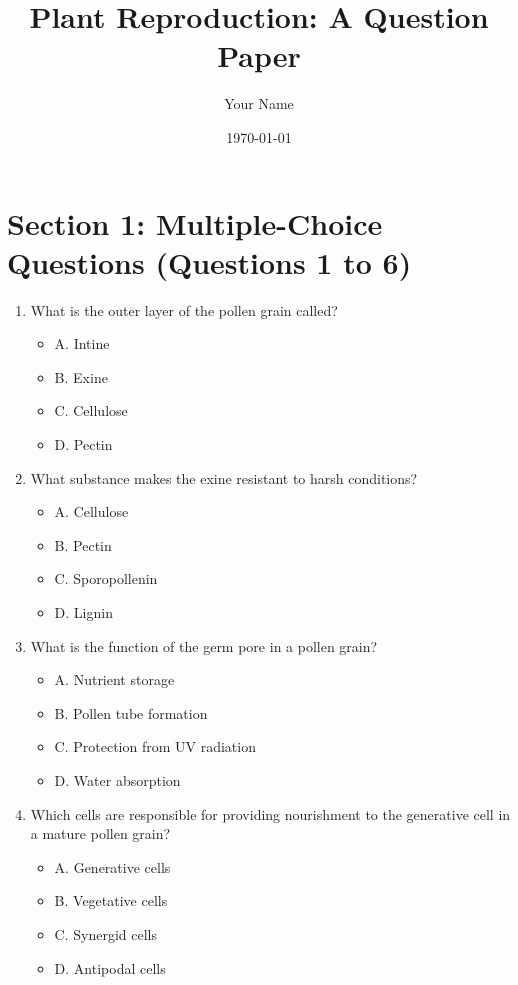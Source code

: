 \documentclass{article}
\title{Plant Reproduction: A Question Paper}
\author{Your Name}
\date{\today}
\begin{document}
\maketitle

\section*{Section 1: Multiple-Choice Questions (Questions 1 to 6)}

\begin{enumerate}
    \item What is the outer layer of the pollen grain called?
        \begin{itemize}
            \item A. Intine
            \item B. Exine
            \item C. Cellulose
            \item D. Pectin
        \end{itemize}
    \item What substance makes the exine resistant to harsh conditions?
        \begin{itemize}
            \item A. Cellulose
            \item B. Pectin
            \item C. Sporopollenin
            \item D. Lignin
        \end{itemize}
    \item What is the function of the germ pore in a pollen grain?
        \begin{itemize}
            \item A. Nutrient storage
            \item B. Pollen tube formation
            \item C. Protection from UV radiation
            \item D. Water absorption
        \end{itemize}
    \item  Which cells are responsible for providing nourishment to the generative cell in a mature pollen grain?
        \begin{itemize}
            \item A. Generative cells
            \item B. Vegetative cells
            \item C. Synergid cells
            \item D. Antipodal cells

\end{itemize}
\end{enumerate}
\end{document}
